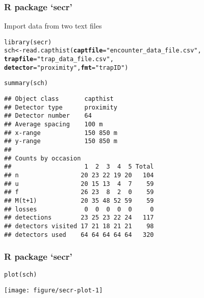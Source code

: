 \documentclass[color=usenames,dvipsnames]{beamer}\usepackage[]{graphicx}\usepackage[]{color}
\makeatletter
\newcommand{\hlstr}[1]{\textcolor[rgb]{0.749,0.012,0.012}{#1}}%
\newcommand{\hlstd}[1]{\textcolor[rgb]{0,0,0}{#1}}%
\newcommand{\hlkwb}[1]{\textcolor[rgb]{0,0.341,0.682}{#1}}%
\newcommand{\hlkwc}[1]{\textcolor[rgb]{0,0,0}{\textbf{#1}}}%
\newcommand{\hlkwd}[1]{\textcolor[rgb]{0.004,0.004,0.506}{#1}}%
\newenvironment{kframe}{%
 \def\at@end@of@kframe{}%
 \ifinner\ifhmode%
  \def\at@end@of@kframe{\end{minipage}}%
  \begin{minipage}{\columnwidth}%
 \fi\fi%
 \def\FrameCommand##1{\hskip\@totalleftmargin \hskip-\fboxsep
 \colorbox{shadecolor}{##1}\hskip-\fboxsep
     \hskip-\linewidth \hskip-\@totalleftmargin \hskip\columnwidth}%
 \MakeFramed {\advance\hsize-\width
   \@totalleftmargin\z@ \linewidth\hsize
   \@setminipage}}%
 {\par\unskip\endMakeFramed%
 \at@end@of@kframe}
\newenvironment{knitrout}{}{} %
\makeatother
\begin{document}
\begin{frame}[fragile]
  \frametitle{R package `secr'}
  Import data from two text files
\begin{knitrout}\tiny
{}\color{fgcolor}\begin{kframe}
\begin{alltt}
\hlkwd{library}\hlstd{(secr)}
\hlstd{sch} \hlkwb{<-} \hlkwd{read.capthist}\hlstd{(}\hlkwc{captfile}\hlstd{=}\hlstr{"encounter_data_file.csv"}\hlstd{,}
                     \hlkwc{trapfile}\hlstd{=}\hlstr{"trap_data_file.csv"}\hlstd{,}
                     \hlkwc{detector}\hlstd{=}\hlstr{"proximity"}\hlstd{,} \hlkwc{fmt}\hlstd{=}\hlstr{"trapID"}\hlstd{)}
\end{alltt}


{\ttfamily\noindent\itshape\color{messagecolor}{\#\# No errors found :-)}}\begin{alltt}
\hlkwd{summary}\hlstd{(sch)}
\end{alltt}
\begin{verbatim}
## Object class       capthist 
## Detector type      proximity 
## Detector number    64 
## Average spacing    100 m 
## x-range            150 850 m 
## y-range            150 850 m 
## 
## Counts by occasion 
##                    1  2  3  4  5 Total
## n                 20 23 22 19 20   104
## u                 20 15 13  4  7    59
## f                 26 23  8  2  0    59
## M(t+1)            20 35 48 52 59    59
## losses             0  0  0  0  0     0
## detections        23 25 23 22 24   117
## detectors visited 17 21 18 21 21    98
## detectors used    64 64 64 64 64   320
\end{verbatim}
\end{kframe}
\end{knitrout}
\end{frame}



\begin{frame}[fragile]
  \frametitle{R package `secr'}
\begin{knitrout}
\color{fgcolor}\begin{kframe}
\begin{alltt}
\hlkwd{plot}\hlstd{(sch)}
\end{alltt}
\end{kframe}

{\centering \texttt{[image: figure/secr-plot-1]} 

}


\end{knitrout}
\end{frame}
\end{document}
